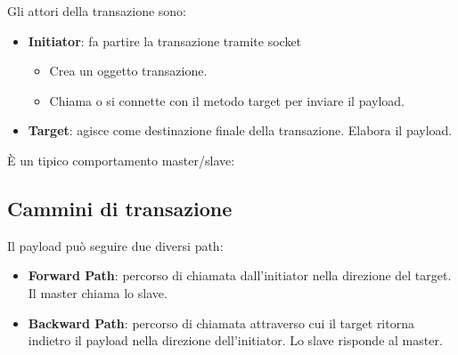 \documentclass[a4paper]{article}
\theoremstyle{definition}
\begin{document}
			\noindent
			Gli attori della transazione sono:
			\begin{itemize}
				\item \textbf{Initiator}: fa partire la transazione tramite socket
				\begin{itemize}
					\item Crea un oggetto transazione.
					\item Chiama o si connette con il metodo target per inviare il payload.
				\end{itemize}
				\item \textbf{Target}: agisce come destinazione finale della transazione. Elabora il payload.
			\end{itemize}
	
			\noindent
			È un tipico comportamento master/slave:
			\bigskip
			
			\begin{center}
			\end{center}
			
		\subsection{Cammini di transazione}
			Il payload può seguire due diversi path:
			\begin{itemize}
				\item \textbf{Forward Path}: percorso di chiamata dall'initiator nella direzione del target. Il master chiama lo slave.
				\item \textbf{Backward Path}: percorso di chiamata attraverso cui il target ritorna indietro il payload nella direzione dell'initiator. Lo slave risponde al master.
			\end{itemize}
		
			\begin{center}
			\end{center}
			
\end{document}
